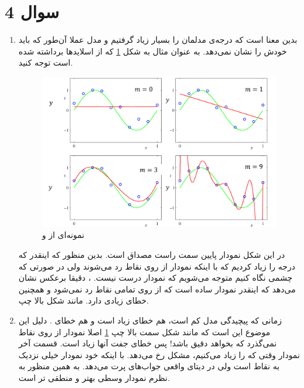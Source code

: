 \section*{سوال 4}
\begin{enumerate}
    \item {} بدین معنا است که درجه‌ی مدلمان را بسیار زیاد گرفتیم و مدل عملا آن‌طور که باید
    خودش را نشان نمی‌دهد. به عنوان مثال به شکل
    \ref{fig:overfit}
    که از اسلاید‌ها برداشته شده است توجه کنید.
    \begin{figure}[H]
        \centering
        \includegraphics[scale=0.5]{pics/overfit.png}
        \caption{نمونه‌ای از  و }
        \label{fig:overfit}
    \end{figure}
    در این شکل نمودار پایین سمت راست مصداق
    است. بدین منظور که اینقدر که درجه را زیاد کردیم که با اینکه نمودار از روی نقاط
    رد می‌شوند ولی در صورتی که چشمی نگاه کنیم متوجه می‌شویم که نمودار درست نیست.
    ،
    دقیقا برعکس نشان می‌دهد که اینقدر نمودار ساده است که از روی تمامی نقاط رد نمی‌شود و همچنین خطای زیادی دارد.
    مانند شکل بالا چپ.
    \item زمانی که پیچیدگی مدل کم است، هم خطای
    زیاد است و هم خطای
    .
    دلیل این موضوع این است که مانند شکل سمت بالا چپ
    \ref{fig:overfit}
    اصلا نمودار از روی نقاط نمی‌گذرد که بخواهد دقیق باشد! پس خطای جفت آنها زیاد است.
    قسمت آخر نمودار وقتی که
    را زیاد می‌کنیم، مشکل
    رخ می‌دهد. با اینکه خود نمودار خیلی نزدیک به نقاط است ولی در دیتای واقعی جواب‌های پرت می‌دهد.
    به همین منظور به نظرم نمودار وسطی بهتر و منطقی تر است.
\end{enumerate}